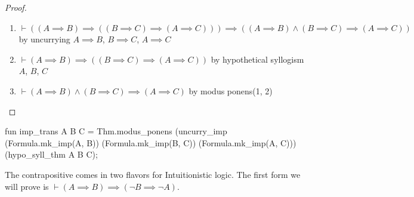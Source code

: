 \begin{proof}
\begin{enumerate}
\item $\vdash((A\implies B)\implies((B\implies C)\implies(A\implies C)))\implies((A\implies B)\land (B\implies C)\implies (A\implies C))$
  by uncurrying $A\implies B$, $B\implies C$, $A\implies C$
\item $\vdash(A\implies B)\implies((B\implies C)\implies(A\implies C))$
  by hypothetical syllogism $A$, $B$, $C$
\item $\vdash(A\implies B)\land (B\implies C)\implies (A\implies C)$
  by modus ponens(1, 2)\qedhere
\end{enumerate}
\end{proof}

\nwenddocs{}\endmoddef\nwstartdeflinemarkup{}\nwenddeflinemarkup
fun imp_trans A B C =
  Thm.modus_ponens (uncurry_imp (Formula.mk_imp(A, B))
                                (Formula.mk_imp(B, C))
                                (Formula.mk_imp(A, C)))
                   (hypo_syll_thm A B C);
\eatline
{}\nwendcode{}\nwdocspar


\begin{node}
The contrapositive comes in two flavors for Intuitionistic logic. The
first form we will prove is $\vdash(A\implies B)\implies(\neg B\implies\neg A)$.
\end{node}

